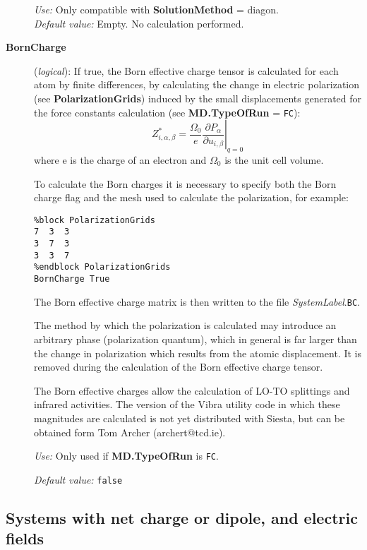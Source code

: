 \documentclass[11pt]{article}
\begin{document}
\begin{description}
{\it Use:} Only compatible with {\bf SolutionMethod} = diagon.\\
{\it Default value:} Empty. No calculation performed.

\item[{\bf BornCharge}] ({\it logical}):
If true, the Born effective charge tensor is calculated for each atom
by finite differences, by calculating the change in electric polarization
(see {\bf PolarizationGrids}) induced by the small displacements generated
for the force constants calculation (see {\bf MD.TypeOfRun} = {\tt FC}):
\begin{equation}\label {eq:effective_charge}
Z^*_{i,\alpha,\beta}=\frac{\Omega_0}{e} \left. {\frac{\partial{P_\alpha}}
{\partial{u_{i,\beta}}}}\right|_{q=0}
\end{equation}
where e is the charge of an electron and $\Omega_0$ is the unit cell volume.

To calculate the Born charges it is necessary to specify both the Born
charge flag and the mesh used to calculate the polarization, for example:
\begin{verbatim}
%block PolarizationGrids
7  3  3
3  7  3
3  3  7
%endblock PolarizationGrids
BornCharge True
\end{verbatim}

The Born effective charge matrix is then written to the file
{\it SystemLabel}.{\tt BC}.

The method by which the polarization is calculated may introduce an arbitrary
phase (polarization quantum), which in general is far larger than the change
in polarization which results from the atomic displacement. It is removed
during the calculation of the Born effective charge tensor.

The Born effective charges allow the calculation of LO-TO splittings and
infrared activities. The version of the Vibra utility code in which these
magnitudes are calculated is not yet distributed with {\sc Siesta}, but can be
obtained form Tom Archer (archert@tcd.ie).

{\it Use:} Only used if {\bf MD.TypeOfRun} is {\tt FC}.

{\it Default value:} {\tt false}

\end{description}

\vspace{5pt}
\subsection{Systems with net charge or dipole, and electric fields}
\end{document}
